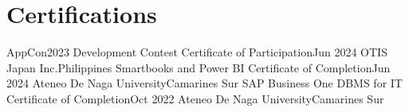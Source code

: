 \section{Certifications}
    \resumeSubHeadingListStart
        \resumeSubheading
        {AppCon2023 Development Contest Certificate of Participation}{Jun 2024}
        {OTIS Japan Inc.}{Philippines}
        \resumeSubheading
        {Smartbooks and Power BI Certificate of Completion}{Jun 2024}
        {Ateneo De Naga University}{Camarines Sur}
        \resumeSubheading
        {SAP Business One DBMS for IT Certificate of Completion}{Oct 2022}
        {Ateneo De Naga University}{Camarines Sur}
    \resumeSubHeadingListEnd